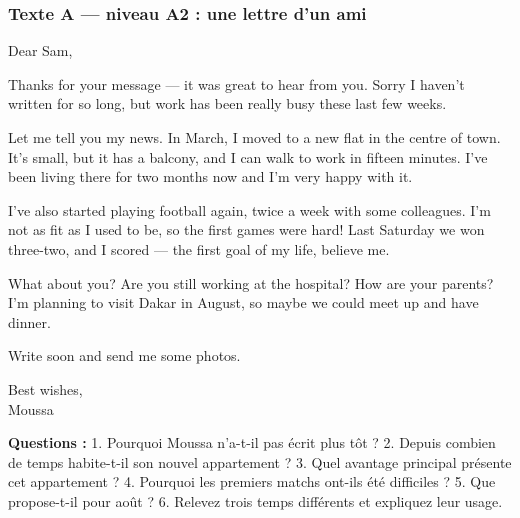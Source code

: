 \subsubsection*{Texte A --- niveau A2 : une lettre d'un ami}
\begin{dialoguebox}[Texte A]
\begin{anglais}
Dear Sam,

Thanks for your message --- it was great to hear from you. Sorry I haven't written for so
long, but work has been really busy these last few weeks.

Let me tell you my news. In March, I moved to a new flat in the centre of town. It's small,
but it has a balcony, and I can walk to work in fifteen minutes. I've been living there for
two months now and I'm very happy with it.

I've also started playing football again, twice a week with some colleagues. I'm not as fit
as I used to be, so the first games were hard! Last Saturday we won three-two, and I scored
--- the first goal of my life, believe me.

What about you? Are you still working at the hospital? How are your parents? I'm planning to
visit Dakar in August, so maybe we could meet up and have dinner.

Write soon and send me some photos.

Best wishes,\\
Moussa
\end{anglais}
\end{dialoguebox}

\textbf{Questions :} 1. Pourquoi Moussa n'a-t-il pas écrit plus tôt ? 2. Depuis combien de
temps habite-t-il son nouvel appartement ? 3. Quel avantage principal présente cet
appartement ? 4. Pourquoi les premiers matchs ont-ils été difficiles ?
5. Que propose-t-il pour août ? 6. Relevez trois temps différents et expliquez leur usage.

